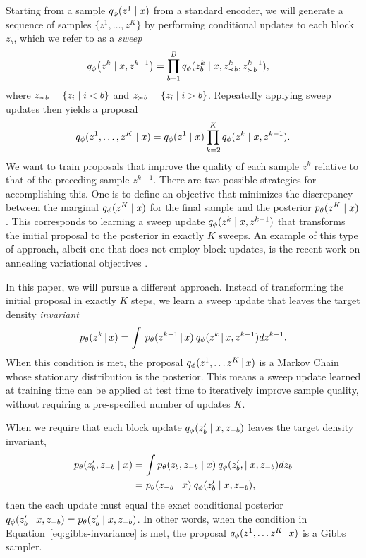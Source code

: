 \documentclass{article}
\theoremstyle{definition}
\begin{document}
Starting from a sample $q_\phi(z^{1} \mid x)$ from a standard encoder, we will generate a sequence of samples $\{z^1, \ldots, z^K\}$ by performing conditional updates to each block $z_b$, which we refer to as a \emph{sweep}
\begin{align}
    \label{eq:approx-gibbs-kernel}
    q_\phi \big( z^k \mid x, z^{k-1} \big)
    &=
    \prod_{b=1}^B
    q_\phi(z^k_b \mid x, z^{k}_{\prec b}, z^{k-1}_{\succ b})
    ,
\end{align}
where $z_{\prec b} = \{z_i \mid i < b\}$ and $z_{\succ b} = \{z_i \mid i > b\}$. Repeatedly applying sweep updates then yields a proposal
\begin{equation*}
    q_\phi(z^1, \ldots, z^K \mid x) 
    =
    q_\phi(z^1 \mid x)
    \prod_{k=2}^K
    q_\phi(z^k \mid x, z^{k-1}).
\end{equation*}
We want to train proposals that improve the quality of each sample $z^k$ relative to that of the preceding sample $z^{k-1}$. There are two possible strategies for accomplishing this. One is to define an objective that minimizes the discrepancy between the marginal $q_\phi(z^K \mid x)$ for the final sample and the posterior $p_\theta(z^K \mid x)$. This corresponds to learning a sweep update $q_\phi(z^k \mid x, z^{k-1})$ that transforms the initial proposal to the posterior in exactly $K$ sweeps. An example of this type of approach, albeit one that does not employ block updates, is the recent work on annealing variational objectives \cite{huang2018improving}.

In this paper, we will pursue a different approach. Instead of transforming the initial proposal in exactly $K$ steps, we learn a sweep update that leaves the target density \emph{invariant}
\begin{equation*}
    p_\theta(z^k \,|\, x) = \int \: p_\theta(z^{k-1} \,|\, x) \: q_\phi(z^k \,|\,x, z^{k-1}) d z^{k-1}.
\end{equation*}
When this condition is met, the proposal $q_\phi(z^1, \ldots z^K \,|\, x)$ is a Markov Chain whose stationary distribution is the posterior. 
This means a sweep update learned at training time can be applied at test time to iteratively improve sample quality, without requiring a pre-specified number of updates $K$.

When we require that each block update $q_\phi(z'_b \mid x, z_{-b})$ leaves the target density invariant, 
\begin{align}
    \label{eq:gibbs-invariance}
    p_\theta(z'_b, z_{-b} \mid x)
    &= 
    \int 
    p_\theta(z_b, z_{-b} \mid x) \:
    q_\phi(z'_b, \mid x, z_{-b}) 
    dz_{b}
    \nonumber
    \\
    &= 
    p_\theta(z_{-b} \mid x) \:
    q_\phi(z'_b \mid x, z_{-b}),
\end{align}
then the each update must equal the exact conditional posterior 
$q_\phi(z'_b \mid x, z_{-b}) = p_\theta(z'_b \mid x, z_{-b})$. In other words, when the condition in Equation~\ref{eq:gibbs-invariance} is met, the proposal $q_\phi(z^1, \ldots z^K \,|\, x)$ is a Gibbs sampler.
\end{document}
